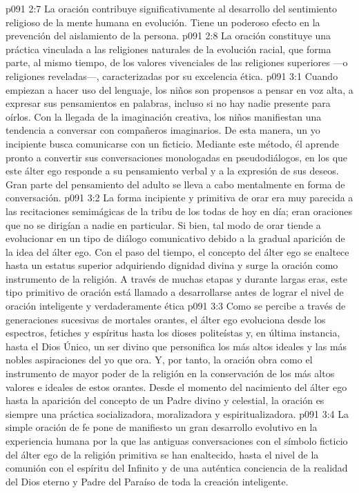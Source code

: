 \vs p091 2:7 La oración contribuye significativamente al desarrollo del sentimiento religioso de la mente humana en evolución. Tiene un poderoso efecto en la prevención del aislamiento de la persona.
\vs p091 2:8 La oración constituye una práctica vinculada a las religiones naturales de la evolución racial, que forma parte, al mismo tiempo, de los valores vivenciales de las religiones superiores ---o religiones reveladas---, caracterizadas por su excelencia ética.
\vs p091 3:1 Cuando empiezan a hacer uso del lenguaje, los niños son propensos a pensar en voz alta, a expresar sus pensamientos en palabras, incluso si no hay nadie presente para oírlos. Con la llegada de la imaginación creativa, los niños manifiestan una tendencia a conversar con compañeros imaginarios. De esta manera, un yo incipiente busca comunicarse con un  ficticio. Mediante este método, él aprende pronto a convertir sus conversaciones monologadas en pseudodiálogos, en los que este álter ego responde a su pensamiento verbal y a la expresión de sus deseos. Gran parte del pensamiento del adulto se lleva a cabo mentalmente en forma de conversación.
\vs p091 3:2 La forma incipiente y primitiva de orar era muy parecida a las recitaciones semimágicas de la tribu de los todas de hoy en día; eran oraciones que no se dirigían a nadie en particular. Si bien, tal modo de orar tiende a evolucionar en un tipo de diálogo comunicativo debido a la gradual aparición de la idea del álter ego. Con el paso del tiempo, el concepto del álter ego se enaltece hasta un estatus superior adquiriendo dignidad divina y surge la oración como instrumento de la religión. A través de muchas etapas y durante largas eras, este tipo primitivo de oración está llamado a desarrollarse antes de lograr el nivel de oración inteligente y verdaderamente ética
\vs p091 3:3 Como se percibe a través de generaciones sucesivas de mortales orantes, el álter ego evoluciona desde los espectros, fetiches y espíritus hasta los dioses politeístas y, en última instancia, hasta el Dios Único, un ser divino que personifica los más altos ideales y las más nobles aspiraciones del yo que ora. Y, por tanto, la oración obra como el instrumento de mayor poder de la religión en la conservación de los más altos valores e ideales de estos orantes. Desde el momento del nacimiento del álter ego hasta la aparición del concepto de un Padre divino y celestial, la oración es siempre una práctica socializadora, moralizadora y espiritualizadora.
\vs p091 3:4 La simple oración de fe pone de manifiesto un gran desarrollo evolutivo en la experiencia humana por la que las antiguas conversaciones con el símbolo ficticio del álter ego de la religión primitiva se han enaltecido, hasta el nivel de la comunión con el espíritu del Infinito y de una auténtica conciencia de la realidad del Dios eterno y Padre del Paraíso de toda la creación inteligente.
